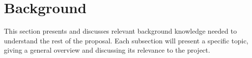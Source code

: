 \section{Background}
\label{sec:background}

This section presents and discusses relevant background knowledge needed to understand the rest of the proposal.
Each subsection will present a specific topic, giving a general overview and discussing its relevance to the project.





